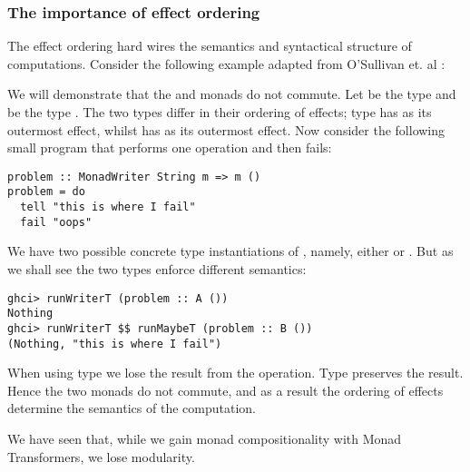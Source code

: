 \subsubsection{The importance of effect ordering}
The effect ordering hard wires the semantics and syntactical structure of computations. Consider the following example adapted from O'Sullivan et. al \cite{O'Sullivan2008}:
\begin{example}
We will demonstrate that the  and  monads do not commute. Let  be the type 
 and  be the type . The two types differ in their ordering of effects; type  has  as its outermost effect, whilst  has  as its outermost effect. Now consider the following small program that performs one  operation and then fails:
\begin{lstlisting}[style=haskell]
problem :: MonadWriter String m => m ()
problem = do
  tell "this is where I fail"
  fail "oops"
\end{lstlisting}
We have two possible concrete type instantiations of , namely, either  or . But as we shall see the two types enforce different semantics:
\begin{lstlisting}[style=haskell]
ghci> runWriterT (problem :: A ())
Nothing
ghci> runWriterT $$ runMaybeT (problem :: B ())
(Nothing, "this is where I fail")
\end{lstlisting}
When using type  we lose the result from the  operation. Type  preserves the result.
Hence the two monads do not commute, and as a result the ordering of effects determine the semantics of the computation.
\end{example}
We have seen that, while we gain monad compositionality with Monad Transformers, we lose modularity.